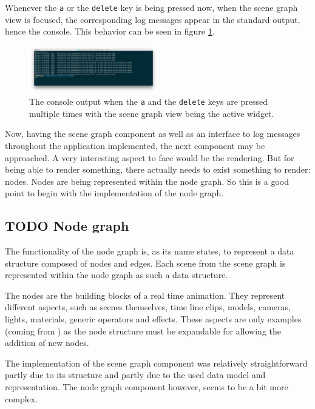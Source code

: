 \documentclass[10pt, openright, notitlepage]{scrreprt}
\begin{document}
Whenever the \texttt{a} or the \texttt{delete} key is being pressed now, when the scene graph
view is focused, the corresponding log messages appear in the standard output,
hence the console. This behavior can be seen in figure \ref{fig:editor-alpha-04}.

\begin{figure}[H]
\centering
\includegraphics[width=0.5\textwidth]{./images/qde_alpha_04.png}
\caption{\label{fig:editor-alpha-04}
The console output when the \texttt{a} and the \texttt{delete} keys are pressed multiple times with the scene graph view being the active widget.}
\end{figure}

Now, having the scene graph component as well as an interface to log messages
throughout the application implemented, the next component may be approached. A
very interesting aspect to face would be the rendering. But for being able to
render something, there actually needs to exist something to render: nodes.
Nodes are being represented within the node graph. So this is a good point to
begin with the implementation of the node graph.
\subsection{{\bfseries\sffamily TODO} Node graph}
\label{sec:orgf9aafc1}
The functionality of the node graph is, as its name states, to represent a data
structure composed of nodes and edges. Each scene from the scene graph is
represented within the node graph as such a data structure.

The nodes are the building blocks of a real time animation. They represent
different aspects, such as scenes themselves, time line clips, models, cameras,
lights, materials, generic operators and effects. These aspects are only examples
(coming from \cite[p. 30 and 31]{osterwalder_qde_2016}) as the node structure
must be expandable for allowing the addition of new nodes.

The implementation of the scene graph component was relatively straightforward
partly due to its structure and partly due to the used data model and
representation. The node graph component however, seems to be a bit more complex.
\end{document}
